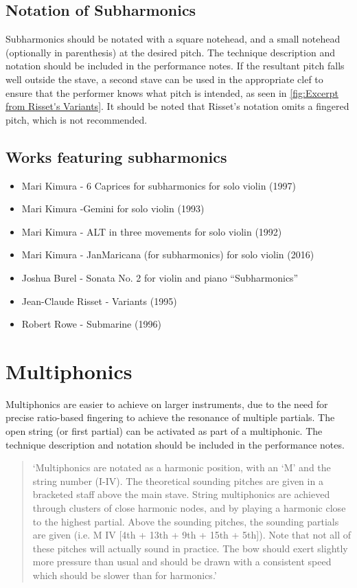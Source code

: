 \subsection{Notation of Subharmonics} \label{sec:notation-subharmonics}
Subharmonics should be notated with a square notehead, and a small notehead (optionally in parenthesis) at the desired pitch.
The technique description and notation should be included in the performance notes.
If the resultant pitch falls well outside the stave, a second stave can be used in the appropriate clef to ensure that the performer knows what pitch is intended, as seen in \autoref{fig:Excerpt from Risset's Variants}.\autocite[]{rissetVariants1995}
It should be noted that Risset's notation omits a fingered pitch, which is not recommended.

\subsection{Works featuring subharmonics }\label{sec:subharmonicsLiterature}

\begin{itemize}
    \item Mari Kimura - 6 Caprices for subharmonics for solo violin (1997) 
    \item Mari Kimura -Gemini for solo violin (1993)
    \item Mari Kimura - ALT in three movements for solo violin (1992)
    \item Mari Kimura - JanMaricana (for subharmonics) for solo violin (2016)
    \item Joshua Burel - Sonata No. 2 for violin and piano “Subharmonics”
    \item Jean-Claude Risset - Variants (1995)
    \item Robert Rowe - Submarine (1996)
\end{itemize}

\section{Multiphonics} \label{sec:multiphonics}
Multiphonics are easier to achieve on larger instruments, due to the need for precise ratio-based fingering to achieve the resonance of multiple partials.
The open string (or first partial) can be activated as part of a multiphonic.\autocite[161]{welbanksFoundationsModernCello}
The technique description and notation should be included in the performance notes.

\begin{quotation}
  `Multiphonics are notated as a harmonic position, with an `M' and the string number (I-IV). 
  The theoretical sounding pitches are given in a bracketed staff above the main stave.
  String multiphonics are achieved through clusters of close harmonic nodes, and by playing a harmonic close to the highest partial.
  Above the sounding pitches, the sounding partials are given (i.e. M IV [4th + 13th + 9th + 15th + 5th]).
  Note that not all of these pitches will actually sound in practice.
  The bow should exert slightly more pressure than usual and should be drawn with a consistent speed which should be slower than for harmonics.'
\end{quotation}

